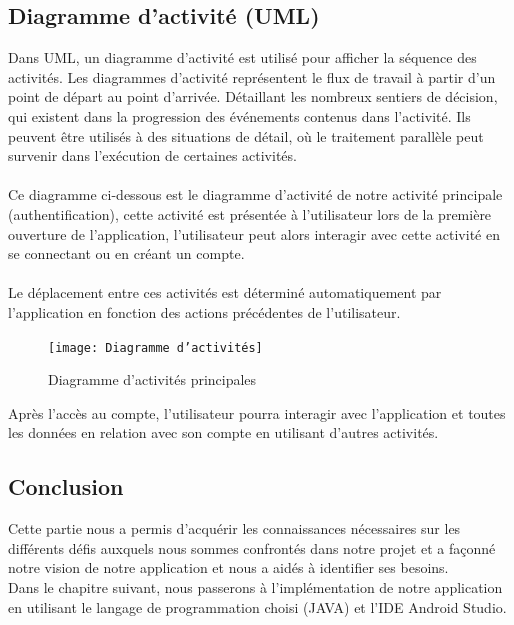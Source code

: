 \documentclass[french]{report}
\begin{document}
\subsection{\LARGE Diagramme d'activité (UML)}
\LARGE Dans UML, un diagramme d’activité est utilisé pour afficher la séquence des activités. Les diagrammes d’activité représentent le flux de travail à partir d’un point de départ au point d’arrivée. Détaillant les nombreux sentiers de décision, qui existent dans la progression des événements contenus dans l’activité. Ils peuvent être utilisés à des situations de détail, où le traitement parallèle peut survenir dans l’exécution de certaines activités.\\\\
Ce diagramme ci-dessous est le diagramme d'activité de notre activité principale (authentification), cette activité est présentée à l'utilisateur lors de la première ouverture de l'application, l'utilisateur peut alors interagir avec cette activité en se connectant ou en créant un compte.\\\\
Le déplacement entre ces activités est déterminé automatiquement par l'application en fonction des actions précédentes de l'utilisateur.
\begin{figure}[H]
    \centering
    \texttt{[image: Diagramme d'activités]}
    \caption{Diagramme d'activités principales}
    \label{fig:activity}
\end{figure}
Après l'accès au compte, l'utilisateur pourra interagir avec l'application et toutes les données en relation avec son compte en utilisant d'autres activités.
\subsection{\LARGE Conclusion}
\LARGE Cette partie nous a permis d'acquérir les connaissances nécessaires sur les différents défis auxquels nous sommes confrontés dans notre projet et a façonné notre vision de notre application et nous a aidés à identifier ses besoins.\\
Dans le chapitre suivant, nous passerons à l'implémentation de notre application en utilisant le langage de programmation choisi (JAVA) et l'IDE Android Studio.
\end{document}
